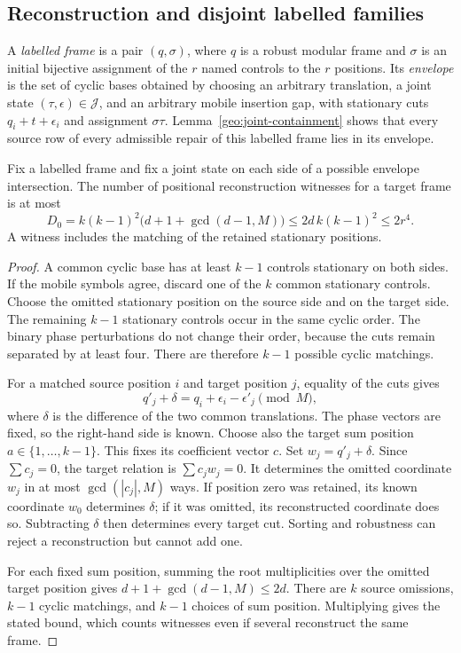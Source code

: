 \subsection{Reconstruction and disjoint labelled families}

A \emph{labelled frame} is a pair $(q,\sigma)$, where $q$ is a robust
modular frame and $\sigma$ is an initial bijective assignment of the $r$
named controls to the $r$ positions. Its \emph{envelope} is the set of
cyclic bases obtained by choosing an arbitrary translation, a joint state
$(\tau,\epsilon)\in\mathcal J$, and an arbitrary mobile insertion gap,
with stationary cuts $q_i+t+\epsilon_i$ and assignment $\sigma\tau$.
Lemma~\ref{geo:joint-containment} shows that every source row of every
admissible repair of this labelled frame lies in its envelope.

\begin{lemma}
\label{geo:reconstruction}
Fix a labelled frame and fix a joint state on each side of a possible
envelope intersection. The number of positional reconstruction witnesses
for a target frame is at most
\[
 D_0=k(k-1)^2\bigl(d+1+\gcd(d-1,M)\bigr)
       \leq2d\,k(k-1)^2\leq2r^4.
\]
A witness includes the matching of the retained stationary positions.
\end{lemma}
\begin{proof}
A common cyclic base has at least $k-1$ controls stationary on both sides.
If the mobile symbols agree, discard one of the $k$ common stationary
controls. Choose the omitted stationary position on the source side and
on the target side. The remaining $k-1$ stationary controls occur in the
same cyclic order. The binary phase perturbations do not change their
order, because the cuts remain separated by at least four. There are
therefore $k-1$ possible cyclic matchings.

For a matched source position $i$ and target position $j$, equality of
the cuts gives
\[
 q'_j+\delta=q_i+\epsilon_i-\epsilon'_j\pmod M,
\]
where $\delta$ is the difference of the two common translations. The
phase vectors are fixed, so the right-hand side is known. Choose also
the target sum position $a\in\{1,\ldots,k-1\}$. This fixes its coefficient
vector $c$. Set $w_j=q'_j+\delta$. Since $\sum c_j=0$, the target relation
is $\sum c_jw_j=0$. It determines the omitted coordinate $w_j$ in at most
$\gcd(|c_j|,M)$ ways. If position zero was retained, its known coordinate
$w_0$ determines $\delta$; if it was omitted, its reconstructed coordinate
does so. Subtracting $\delta$ then determines every target cut. Sorting
and robustness can reject a reconstruction but cannot add one.

For each fixed sum position, summing the root multiplicities over the
omitted target position gives
$d+1+\gcd(d-1,M)\leq2d$. There are $k$ source omissions, $k-1$ cyclic
matchings, and $k-1$ choices of sum position. Multiplying gives the stated
bound, which counts witnesses even if several reconstruct the same frame.
\end{proof}

